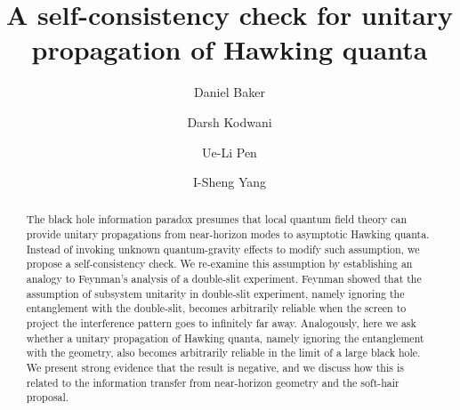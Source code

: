 \documentclass[aps,showpacs,twocolumn,floats,prd,superscriptaddress,nofootinbib]{revtex4-1}
\begin{document}
\title{A self-consistency check for unitary propagation of Hawking quanta}

\author{Daniel Baker}

\author{Darsh Kodwani}

\author{Ue-Li Pen}

\author{I-Sheng Yang}


\begin{abstract}
The black hole information paradox presumes that local quantum field theory can provide unitary propagations from near-horizon modes to asymptotic Hawking quanta. 
Instead of invoking unknown quantum-gravity effects to modify such assumption, we propose a self-consistency check.
We re-examine this assumption by establishing an analogy to Feynman's analysis of a double-slit experiment. 
Feynman showed that the assumption of subsystem unitarity in double-slit experiment, namely ignoring the entanglement with the double-slit, becomes arbitrarily reliable when the screen to project the interference pattern goes to infinitely far away.
Analogously, here we ask whether a unitary propagation of Hawking quanta, namely ignoring the entanglement with the geometry, also becomes arbitrarily reliable in the limit of a large black hole. 
We present strong evidence that the result is negative, and we discuss how this is related to the information transfer from near-horizon geometry and the soft-hair proposal.
\end{abstract}
\end{document}
